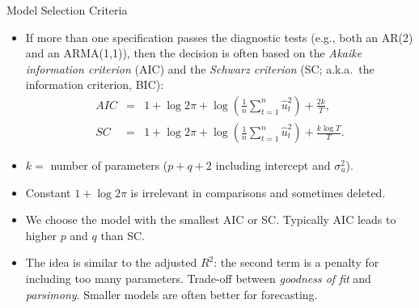 \begin{frame}{Model Selection Criteria}
\begin{itemize}

\item If more than one specification
passes the diagnostic tests (e.g., both an AR(2) and an ARMA(1,1)), then the decision is often based on the
 \emph{\color{red}Akaike
information criterion} (AIC) and the \emph{\color{red}Schwarz criterion}
(SC; a.k.a.\ the  information criterion, BIC):
\begin{eqnarray*}
AIC &=&1+\log 2\pi +\log \left( \frac{1}{n}\sum_{t=1}^{n}\hat{u}%
_{t}^{2}\right) +\frac{2k}{T}, \\
SC &=&1+\log 2\pi +\log \left( \frac{1}{n}\sum_{t=1}^{n}\hat{u}_{t}^{2}\right)
+\frac{k\log T}{T}.
\end{eqnarray*}%
\item $k=$ number of parameters  ($p+q+2$ including intercept and $\sigma^2_u$).
\item Constant $1+\log 2\pi $ is irrelevant in comparisons and sometimes
deleted.
\item We choose the model with the smallest AIC or SC. Typically AIC
leads to higher $p$ and $q$ than SC.
\item The idea is similar to the adjusted $R^2$: the second term is a penalty for including too many parameters. Trade-off between \emph{\color{red}%
goodness of fit} and \emph{\color{red}parsimony}. Smaller models are often better for forecasting.
\end{itemize}
\end{frame}
